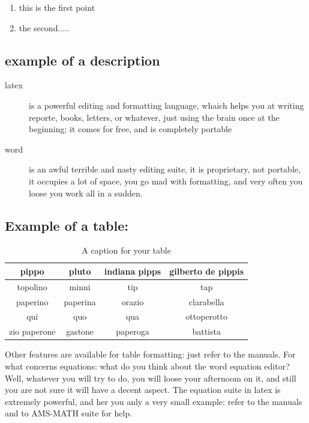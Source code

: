 \begin{enumerate}
\item this is the first point
\item the second.....
\end{enumerate}



\subsection{example of a description}
\begin{description}
\item[latex] is a powerful editing and formatting language, whaich helps you
at writing reporte, books, letters, or whatever, just using the brain 
once at the beginning; it comes for free, and is completely portable
\item[word] is an awful terrible and nasty editing suite, it is proprietary,
not portable, it occupies a lot of space, you go mad with formatting,
and very often you loose you work all in a sudden. 
\end{description}


\subsection{Example of a table:}

\begin{table}
\begin{center}
\begin{tabular}{|c|c|c|c|}
\hline
pippo & pluto & indiana pipps & gilberto de pippis \\
\hline
topolino & minni & tip & tap \\
\hline
\hline
paperino & paperina & orazio & clarabella \\
\hline
qui & quo & qua & ottoperotto \\
zio paperone & gastone & paperoga & battista \\ 
\hline 
\end{tabular}
\end{center}
\caption{A caption for your table}
\label{A-lable-for-your-table}
\end{table}


Other features are available for table formatting: just refer to the manuals.
For what concerns equations: what do you think about the word equation editor?
Well, whatever you will try to do, you will loose your afternoom on it, and
still you are not sure it will have a decent aspect. The equation suite
in latex is extremely powerful, and her you anly a very small example:
refer to the manuals and to AMS-MATH suite for help.


